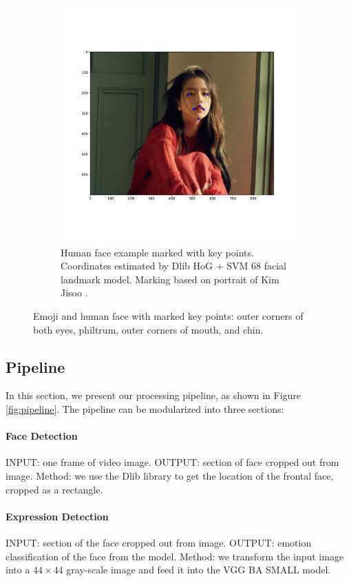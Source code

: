 \documentclass{article}
\begin{document}
\begin{figure}
\begin{subfigure}[b]{0.48\textwidth}
        \includegraphics[width=\textwidth]{figs/face_with_marks.pdf}
        \caption{Human face example marked with key points. Coordinates estimated by Dlib HoG + SVM 68 facial landmark model. Marking based on portrait of Kim Jisoo \cite{jisoo}.}
        \label{fig:face marked}
        \vspace{0.8em}
    \end{subfigure}
    \caption{Emoji and human face with marked key points: outer corners of both eyes, philtrum, outer corners of mouth, and chin. }
    \label{fig: human face and emoji}
\end{figure}
\subsection{Pipeline}
In this section, we present our processing pipeline, as shown in Figure \ref{fig:pipeline}. The pipeline can be modularized into three sections:
\paragraph{Face Detection} INPUT: one frame of video image. OUTPUT: section of face cropped out from image. Method: we use the Dlib library to get the location of the frontal face, cropped as a rectangle.
\paragraph{Expression Detection} INPUT: section of the face cropped out from image. OUTPUT: emotion classification of the face from the model. Method: we transform the input image into a $44 \times 44$ gray-scale image and feed it into the VGG BA SMALL model.
\end{document}
